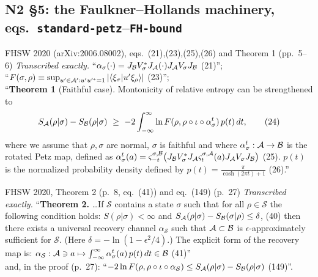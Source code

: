 \documentclass[11pt]{article}
\newcommand{\loc}[1]{{\small\texttt{#1}}}
\newcommand{\1}{\mathbf 1}
\begin{document}
\subsection{N2 \S5: the Faulkner--Hollands machinery, eqs.\ \loc{standard-petz}--\loc{FH-bound}}

\begin{citedbox}{FHSW 2020 (arXiv:2006.08002), eqs.~(21),(23),(25),(26) and Theorem 1 (pp.~5--6)}
\emph{Transcribed exactly.} ``$\alpha_\sigma(\cdot)=J_{\mathcal B}V_\sigma^*J_{\mathcal A}(\cdot)J_{\mathcal A}V_\sigma J_{\mathcal B}$ (21)''; \\
``$F(\sigma,\rho)\equiv\sup_{u'\in\mathcal A':u'u'^*=1}|\langle\xi_\sigma|u'\xi_\rho\rangle|$ (23)''; \\
``\textbf{Theorem 1} (Faithful case). Montonicity of relative entropy can be strengthened to
\[S_{\cA}(\rho|\sigma)-S_{\cB}(\rho|\sigma)\ \ge\ -2\int_{-\infty}^{\infty}\ln F(\rho,\rho\circ\iota\circ\alpha^t_\sigma)\,p(t)\,dt,\qquad(24)\]
where we assume that $\rho,\sigma$ are normal, $\sigma$ is faithful and where
$\alpha^t_\sigma:\mathcal A\to\mathcal B$ is the rotated Petz map, defined as
$\alpha^t_\sigma(a)=\varsigma^{\sigma,\mathcal B}_{-t}\bigl(J_{\mathcal B}V^*_\sigma J_{\mathcal A}\varsigma^{\sigma,\mathcal A}_t(a)J_{\mathcal A}V_\sigma J_{\mathcal B}\bigr)$ (25).
$p(t)$ is the normalized probability density defined by $p(t)=\frac{\pi}{\cosh(2\pi t)+1}$ (26).''\\[2pt]
\end{citedbox}

\begin{citedbox}{FHSW 2020, Theorem 2 (p.~8, eq.~(41)) and eq.~(149) (p.~27)}
\emph{Transcribed exactly.} ``\textbf{Theorem 2.} \dots If $\mathcal S$ contains a state $\sigma$ such
that for all $\rho\in\mathcal S$ the following condition holds:
$S(\rho|\sigma)<\infty$ and $S_{\mathcal A}(\rho|\sigma)-S_{\mathcal B}(\sigma|\rho)\le\delta$, (40)
then there exists a universal recovery channel $\alpha_{\mathcal S}$ such that $\mathcal A\subset\mathcal B$ is
$\epsilon$-approximately sufficient for $\mathcal S$. (Here $\delta=-\ln(1-\epsilon^2/4)$.)
The explicit form of the recovery map is:
$\alpha_{\mathcal S}:\mathcal A\ni a\mapsto\int_{-\infty}^{\infty}\alpha^t_\sigma(a)\,p(t)\,dt\in\mathcal B$ (41)''\\[2pt]
and, in the proof (p.~27): ``$-2\ln F(\rho,\rho\circ\iota\circ\alpha_{\mathcal S})\le S_{\mathcal A}(\rho|\sigma)-S_{\mathcal B}(\rho|\sigma)$ (149)''.\\[2pt]
\\
\end{citedbox}
\end{document}
